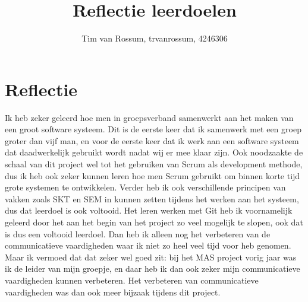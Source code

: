 \documentclass[]{article}
\title{Reflectie leerdoelen}
\author{Tim van Rossum, trvanrossum, 4246306}
\begin{document}
\maketitle
\section*{Reflectie}
Ik heb zeker geleerd hoe men in groepsverband samenwerkt aan het maken van een groot software systeem. Dit is de eerste keer dat ik samenwerk met een groep groter dan vijf man, en voor de eerste keer dat ik werk aan een software systeem dat daadwerkelijk gebruikt wordt nadat wij er mee klaar zijn. Ook noodzaakte de schaal van dit project wel tot het gebruiken van Scrum als development methode, dus ik heb ook zeker kunnen leren hoe men Scrum gebruikt om binnen korte tijd grote systemen te ontwikkelen. Verder heb ik ook verschillende principen van vakken zoals SKT en SEM in kunnen zetten tijdens het werken aan het systeem, dus dat leerdoel is ook voltooid. Het leren werken met Git heb ik voornamelijk geleerd door het aan het begin van het project zo veel mogelijk te slopen, ook dat is dus een voltooid leerdoel. Dan heb ik alleen nog het verbeteren van de communicatieve vaardigheden waar ik niet zo heel veel tijd voor heb genomen. Maar ik vermoed dat dat zeker wel goed zit: bij het MAS project vorig jaar was ik de leider van mijn groepje, en daar heb ik dan ook zeker mijn communicatieve vaardigheden kunnen verbeteren. Het verbeteren van communicatieve vaardigheden was dan ook meer bijzaak tijdens dit project.
\end{document}

